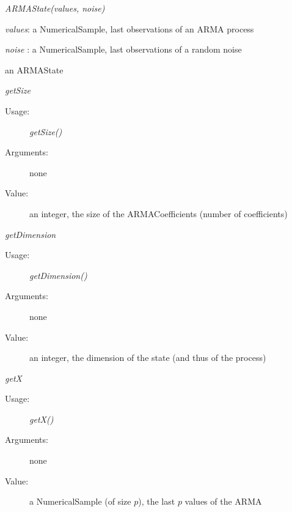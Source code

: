 \begin{description}

\item[Usage:] \rule{0pt}{1em}
\begin{description}
\item \textit{ARMAState(values, noise)}
\end{description}
\bigskip

\item[Arguments:]  \rule{0pt}{1em}
\begin{description}
\item \textit{values}: a NumericalSample, last observations of an ARMA process
\item \textit{noise}  : a NumericalSample, last observations of a random noise
\end{description}
\bigskip

\item[Value:] an ARMAState
\bigskip

\item[Some methods :]  \rule{0pt}{1em}

\begin{description}

\item \textit{getSize}
\begin{description}
\item[Usage:] \textit{getSize()}
\item[Arguments:] none
\item[Value:]   an integer, the size of the ARMACoefficients (number of coefficients)
\end{description}
\bigskip

\item \textit{getDimension}
\begin{description}
\item[Usage:] \textit{getDimension()}
\item[Arguments:] none
\item[Value:]   an integer, the dimension of the state (and thus of the process)
\end{description}
\bigskip

\item \textit{getX}
\begin{description}
\item[Usage:] \textit{getX()}
\item[Arguments:] none
\item[Value:] a NumericalSample (of size $p$), the last $p$ values of the ARMA
\end{description}
\bigskip


\end{description}
\end{description}
